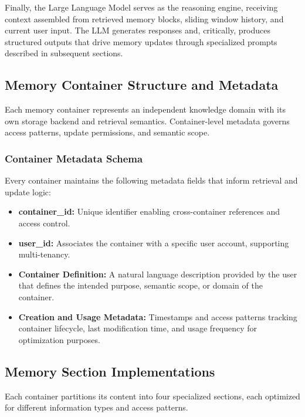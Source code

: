 ﻿\documentclass[12pt,a4paper]{article}
\begin{document}
Finally, the Large Language Model serves as the reasoning engine, receiving context assembled from retrieved memory blocks, sliding window history, and current user input. The LLM generates responses and, critically, produces structured outputs that drive memory updates through specialized prompts described in subsequent sections.

\subsection{Memory Container Structure and Metadata}

Each memory container represents an independent knowledge domain with its own storage backend and retrieval semantics. Container-level metadata governs access patterns, update permissions, and semantic scope.

\subsubsection{Container Metadata Schema}

Every container maintains the following metadata fields that inform retrieval and update logic:

\begin{itemize}
    \item \textbf{container\_id:} Unique identifier enabling cross-container references and access control.
    
    \item \textbf{user\_id:} Associates the container with a specific user account, supporting multi-tenancy.
    
    \item \textbf{Container Definition:} A natural language description provided by the user that defines the intended purpose, semantic scope, or domain of the container. 
    
    \item \textbf{Creation and Usage Metadata:} Timestamps and access patterns tracking container lifecycle, last modification time, and usage frequency for optimization purposes.
\end{itemize}


\subsection{Memory Section Implementations}

Each container partitions its content into four specialized sections, each optimized for different information types and access patterns.
\end{document}
